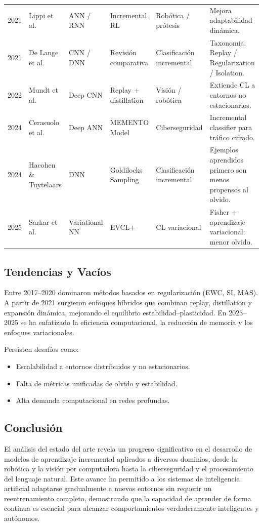 \documentclass[10pt,a4paper]{article}
\begin{document}
\begin{table}[H]
\begin{tabularx}{\textwidth}{p{1.3cm} p{2.6cm} p{2.5cm} p{2.4cm} p{2.3cm} X}
2021 & Lippi et al. & ANN / RNN & Incremental RL & Robótica / prótesis & Mejora adaptabilidad dinámica. \\
2021 & De Lange et al. & CNN / DNN & Revisión comparativa & Clasificación incremental & Taxonomía: Replay / Regularization / Isolation. \\
2022 & Mundt et al. & Deep CNN & Replay + distillation & Visión / robótica & Extiende CL a entornos no estacionarios. \\
2024 & Cerasuolo et al. & Deep ANN & MEMENTO Model & Ciberseguridad & Incremental classifier para tráfico cifrado. \\
2024 & Hacohen \& Tuytelaars & DNN & Goldilocks Sampling & Clasificación incremental & Ejemplos aprendidos primero son menos propensos al olvido. \\
2025 & Sarkar et al. & Variational NN & EVCL+ & CL variacional & Fisher + aprendizaje variacional: menor olvido. \\
\bottomrule
\end{tabularx}
\end{table}

\subsection{Tendencias y Vacíos}
Entre 2017–2020 dominaron métodos basados en regularización (EWC, SI, MAS).  
A partir de 2021 surgieron enfoques híbridos que combinan replay, distillation y expansión dinámica, mejorando el equilibrio estabilidad–plasticidad.  
En 2023–2025 se ha enfatizado la eficiencia computacional, la reducción de memoria y los enfoques variacionales.

Persisten desafíos como:
\begin{itemize}
    \item Escalabilidad a entornos distribuidos y no estacionarios.
    \item Falta de métricas unificadas de olvido y estabilidad.
    \item Alta demanda computacional en redes profundas.
\end{itemize}

\subsection{Conclusión}

El análisis del estado del arte revela un progreso significativo en el desarrollo de modelos de aprendizaje incremental aplicados a diversos dominios, desde la robótica y la visión por computadora hasta la ciberseguridad y el procesamiento del lenguaje natural. 
Este avance ha permitido a los sistemas de inteligencia artificial adaptarse gradualmente a nuevos entornos sin requerir un reentrenamiento completo, demostrando que la capacidad de aprender de forma continua es esencial para alcanzar comportamientos verdaderamente inteligentes y autónomos.
\end{document}
